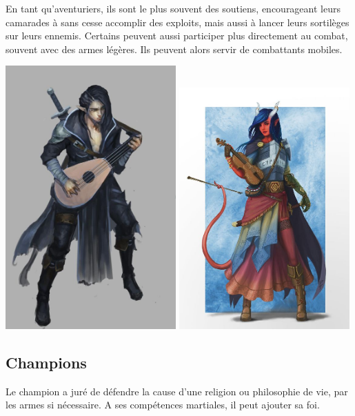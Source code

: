 \documentclass[10pt,a4paper]{book}
\begin{document}
En tant qu'aventuriers, ils sont le plus souvent des soutiens, encourageant leurs camarades à sans cesse accomplir des exploits, mais aussi à lancer leurs sortilèges sur leurs ennemis. Certains peuvent aussi participer plus directement au combat, souvent avec des armes légères. Ils peuvent alors servir de combattants mobiles.

\includegraphics[width=0.49\textwidth]{barde 1}
\includegraphics[width=0.49\textwidth]{barde 2}
\subsection{Champions}
Le champion a juré de défendre la cause d'une religion ou philosophie de vie, par les armes si nécessaire. A ses compétences martiales, il peut ajouter sa foi.
\end{document}
